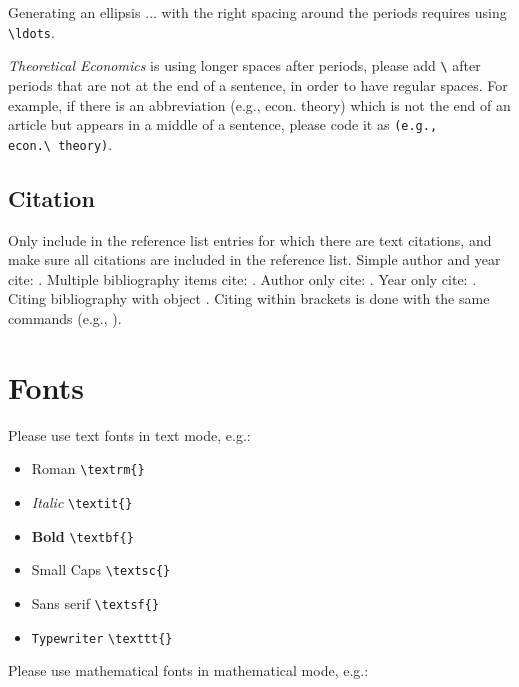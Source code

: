 \documentclass[qe,nameyear,draft]{econsocart}
\theoremstyle{plain}
\begin{document}
Generating an ellipsis $\ldots$ with the right spacing
around the periods requires using \texttt{{\textbackslash}ldots}.

\textit{Theoretical Economics} is using longer spaces after periods, please add \texttt{{\textbackslash}} after periods that are not at the end of a sentence, in order to have regular spaces. For example, if there is an abbreviation (e.g., econ. theory) which is not the end of an article but appears in a middle of a sentence, please code it as \texttt{(e.g., econ.{\textbackslash}~theory)}.

\subsection{Citation}

Only include in the reference list entries for which there are text citations,
and make sure all citations are included in the reference list.
Simple author and year cite: \citet{b1}.
Multiple bibliography items cite: \citet{b2, b3, b4, b5}.
Author only cite: \citet{b4}.
Year only cite: \citet{b4}. Citing bibliography with object \citet{b1}. Citing within brackets is done with the same commands (e.g., \citet{b2, b3, b4}).

\section{Fonts}

Please use text fonts in text mode, e.g.:

\begin{itemize}
\item Roman \texttt{{\textbackslash}textrm\{\}}
\item \textit{Italic} \texttt{{\textbackslash}textit\{\}}
\item \textbf{Bold} \texttt{{\textbackslash}textbf\{\}}
\item Small Caps \texttt{{\textbackslash}textsc\{\}}
\item Sans serif \texttt{{\textbackslash}textsf\{\}}
\item \texttt{Typewriter} \texttt{{\textbackslash}texttt\{\}}
\end{itemize}

Please use mathematical fonts in mathematical mode, e.g.:
\end{document}
